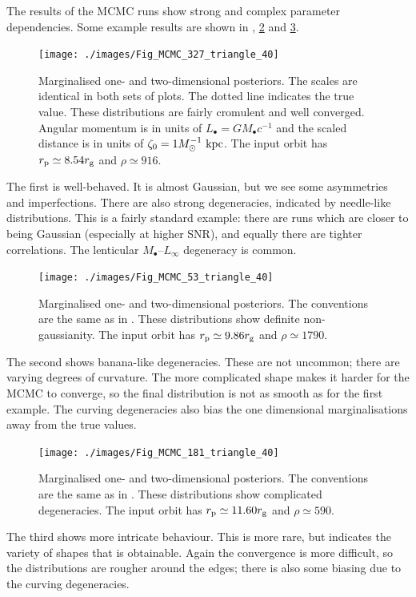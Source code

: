 The results of the MCMC runs show strong and complex parameter dependencies. Some example results are shown in , \ref{fig:MCMC-2} and \ref{fig:MCMC-3}.
\begin{figure}%
\begin{center}
\vspace{0.5\baselineskip}
   \texttt{[image: ./images/Fig\_MCMC\_327\_triangle\_40]}
\caption{Marginalised one- and two-dimensional posteriors. The scales are identical in both sets of plots. The dotted line indicates the true value. These distributions are fairly cromulent and well converged. Angular momentum is in units of $L_\bullet = GM_\bullet c^{-1}$  and the scaled distance is in units of $\zeta_0 = 1 M_\odot^{-1}~\mathrm{kpc}$. The input orbit has $r_\mathrm{p} \simeq 8.54 r_\mathrm{g}$ and $\rho \simeq 916$.\label{fig:MCMC-1}}
\end{center}
\end{figure}
The first is well-behaved. It is almost Gaussian, but we see some asymmetries and imperfections. There are also strong degeneracies, indicated by needle-like distributions. This is a fairly standard example: there are runs which are closer to being Gaussian (especially at higher SNR), and equally there are tighter correlations. The lenticular $M_\bullet$--$L_\infty$ degeneracy is common.

\begin{figure}%
\begin{center}
\vspace{0.5\baselineskip}
   \texttt{[image: ./images/Fig\_MCMC\_53\_triangle\_40]}
\caption{Marginalised one- and two-dimensional posteriors. The conventions are the same as in . These distributions show definite non-gaussianity. The input orbit has $r_\mathrm{p} \simeq 9.86 r_\mathrm{g}$ and $\rho \simeq 1790$.\label{fig:MCMC-2}}
\end{center}
\end{figure}
The second shows banana-like degeneracies. These are not uncommon; there are varying degrees of curvature. The more complicated shape makes it harder for the MCMC to converge, so the final distribution is not as smooth as for the first example. The curving degeneracies also bias the one dimensional marginalisations away from the true values.

\begin{figure}%
\begin{center}
\vspace{0.5\baselineskip}
   \texttt{[image: ./images/Fig\_MCMC\_181\_triangle\_40]}
\caption{Marginalised one- and two-dimensional posteriors. The conventions are the same as in . These distributions show complicated degeneracies. The input orbit has $r_\mathrm{p} \simeq 11.60 r_\mathrm{g}$ and $\rho \simeq 590$.}
\label{fig:MCMC-3}
\end{center}
\end{figure}
The third shows more intricate behaviour. This is more rare, but indicates the variety of shapes that is obtainable. Again the convergence is more difficult, so the distributions are rougher around the edges; there is also some biasing due to the curving degeneracies.

